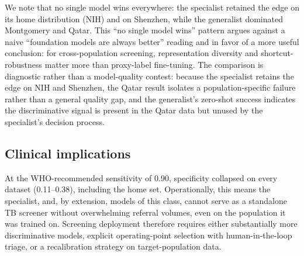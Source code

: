 \documentclass[runningheads]{llncs}
\begin{document}
We note that no single model wins everywhere: the specialist retained the edge on its home distribution (NIH) and on Shenzhen, while the generalist dominated Montgomery and Qatar. This ``no single model wins'' pattern argues against a naive ``foundation models are always better'' reading and in favor of a more useful conclusion: for cross-population screening, representation diversity and shortcut-robustness matter more than proxy-label fine-tuning. The comparison is diagnostic rather than a model-quality contest: because the specialist retains the edge on NIH and Shenzhen, the Qatar result isolates a population-specific failure rather than a general quality gap, and the generalist's zero-shot success indicates the discriminative signal is present in the Qatar data but unused by the specialist's decision process.

\subsection{Clinical implications}
At the WHO-recommended sensitivity of 0.90, specificity collapsed on every dataset (0.11--0.38), including the home set. Operationally, this means the specialist, and, by extension, models of this class, cannot serve as a standalone TB screener without overwhelming referral volumes, even on the population it was trained on. Screening deployment therefore requires either substantially more discriminative models, explicit operating-point selection with human-in-the-loop triage, or a recalibration strategy on target-population data.
\end{document}

